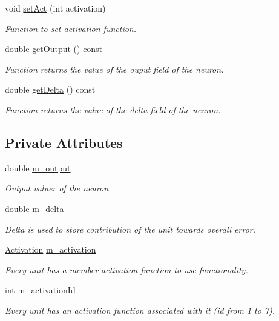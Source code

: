\begin{DoxyCompactItemize}
void \hyperlink{classUnit_a2225e9daca5d114f537f2b4b27a6ece3}{set\+Act} (int activation)
\begin{DoxyCompactList}\small\item\em Function to set activation function. \end{DoxyCompactList}\item 
double \hyperlink{classUnit_ac3ee1ea3d7e06539bf7fe7d4750a5d9d}{get\+Output} () const 
\begin{DoxyCompactList}\small\item\em Function returns the value of the ouput field of the neuron. \end{DoxyCompactList}\item 
double \hyperlink{classUnit_afe55cf9b57e9eb382449cf72b3896d99}{get\+Delta} () const 
\begin{DoxyCompactList}\small\item\em Function returns the value of the delta field of the neuron. \end{DoxyCompactList}\end{DoxyCompactItemize}
\subsection*{Private Attributes}
\begin{DoxyCompactItemize}
\item 
double \hyperlink{classUnit_a7866b2f28d164ca1f51229114dd8adfc}{m\+\_\+output}
\begin{DoxyCompactList}\small\item\em Output valuer of the neuron. \end{DoxyCompactList}\item 
double \hyperlink{classUnit_ad76aecbc14a56812e250991a2db4a176}{m\+\_\+delta}
\begin{DoxyCompactList}\small\item\em Delta is used to store contribution of the unit towards overall error. \end{DoxyCompactList}\item 
\hyperlink{classActivation}{Activation} \hyperlink{classUnit_a91c559e1e32ca2beb316d315943845e0}{m\+\_\+activation}
\begin{DoxyCompactList}\small\item\em Every unit has a member activation function to use functionality. \end{DoxyCompactList}\item 
int \hyperlink{classUnit_a20a0aafb8a4a19a09636f15ebdbbda9a}{m\+\_\+activation\+Id}
\begin{DoxyCompactList}\small\item\em Every unit has an activation function associated with it (id from 1 to 7). \end{DoxyCompactList}\end{DoxyCompactItemize}
